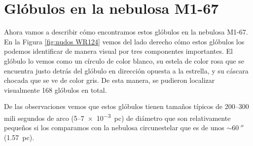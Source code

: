 \documentclass{book}
\begin{document}
\chapter{Glóbulos en la nebulosa M1-67} \label{Chapter : 3}

Ahora vamos a describir cómo encontramos estos glóbulos en la nebulosa
M1-67. En la Figura \ref{fig:nudos WR124} vemos del lado derecho cómo
estos glóbulos los podemos identificar de manera visual por tres
componentes importantes. El glóbulo lo vemos como un círculo de color
blanco, su estela de color rosa que se encuentra justo detrás del
glóbulo en dirección opuesta a la estrella, y su cáscara chocada que
se ve de color gris. De esta manera, se pudieron localizar visualmente
168 glóbulos en total.


De las observaciones vemos que estos glóbulos tienen tamaños típicos
de 200--300 mili segundos de arco (5--\SI{7e-3}{pc}) de diámetro que son
relativamente pequeños si los comparamos con la nebulosa circunestelar
que es de unos $\sim\SI{60}{\arcsecond}$ (\SI{1.57}{pc}).
\end{document}
